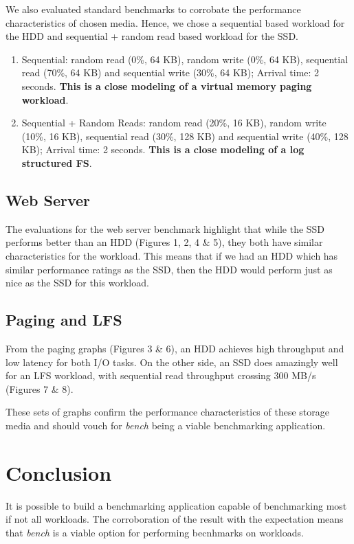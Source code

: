 \documentclass[10pt, author, twocolumn]{article}
\begin{document}
We also evaluated standard benchmarks to corrobate the performance characteristics of chosen media. Hence, we chose a sequential based workload for the HDD and sequential + random read based workload for the SSD. 

\begin{enumerate}
    \item Sequential: random read (0\%, 64 KB), random write (0\%, 64 KB), sequential read (70\%, 64 KB) and sequential write (30\%, 64 KB); Arrival time: 2 seconds. \textbf{This is a close modeling of a virtual memory paging workload}.
    \item Sequential + Random Reads: random read (20\%, 16 KB), random write (10\%, 16 KB), sequential read (30\%, 128 KB) and sequential write (40\%, 128 KB); Arrival time: 2 seconds. \textbf{This is a close modeling of a log structured FS}.
\end{enumerate}

\subsection{Web Server}
The evaluations for the web server benchmark highlight that while the SSD performs better than an HDD (Figures 1, 2, 4 \& 5), they both have similar characteristics for the workload. This means that if we had an HDD which has similar performance ratings as the SSD, then the HDD would perform just as nice as the SSD for this workload. 

\subsection{Paging and LFS}
From the paging graphs (Figures 3 \& 6), an HDD achieves high throughput and low latency for both I/O tasks. On the other side, an SSD does amazingly well for an LFS workload, with sequential read throughput crossing 300 MB/s (Figures 7 \& 8). 

These sets of graphs confirm the performance characteristics of these storage media and should vouch for \textit{bench} being a viable benchmarking application.

\section{Conclusion}
It is possible to build a benchmarking application capable of benchmarking most if not all workloads. The corroboration of the result with the expectation means that \textit{bench} is a viable option for performing becnhmarks on workloads. 
\end{document}
